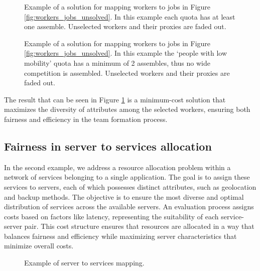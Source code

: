         \begin{figure}[!ht]
            \centering
            
            \caption{Example of a solution for mapping workers to jobs in Figure \ref{fig:workers_jobs_unsolved}. In this example each quota has at least one assemble. Unselected workers and their proxies are faded out.}
            \label{fig:workers_jobs_solved}
        \end{figure}

        \begin{figure}[!ht]
            \centering
            
            \caption{Example of a solution for mapping workers to jobs in Figure \ref{fig:workers_jobs_unsolved}. In this example the `people with low mobility' quota has a minimum of 2 assembles, thus no wide competition is assembled. Unselected workers and their proxies are faded out.}
            \label{fig:workers_jobs_solved_no_wc}
        \end{figure}
        
         
        The result that can be seen in Figure {\ref{fig:workers_jobs_solved}} is a minimum-cost solution that maximizes the diversity of attributes among the selected workers, ensuring both fairness and efficiency in the team formation process. 
        
        \subsection{Fairness in server to services allocation}
        
        In the second example, we address a resource allocation problem within a network of services belonging to a single application. The goal is to assign these services to servers, each of which possesses distinct attributes, such as geolocation and backup methods. The objective is to ensure the most diverse and optimal distribution of services across the available servers. An evaluation process assigns costs based on factors like latency, representing the suitability of each service-server pair. This cost structure ensures that resources are allocated in a way that balances fairness and efficiency while maximizing server characteristics that minimize overall costs.
        
        \begin{figure}[!ht]
            \centering
            
            \caption{Example of server to services mapping.}
            \label{fig:server_services_unsolved}
        \end{figure}
        

